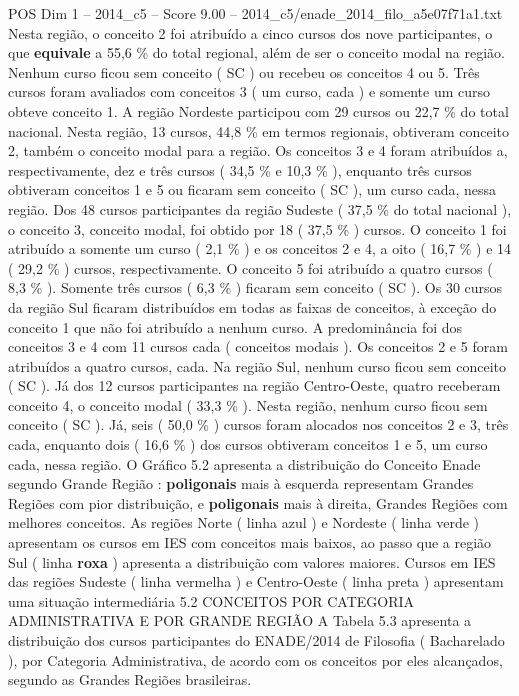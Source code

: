\begin{textsample}{POS Dim 1 – 2014\_c5 – Score 9.00 – 2014\_c5/enade\_2014\_filo\_a5e07f71a1.txt}
Nesta região, o conceito 2 foi atribuído a cinco cursos dos nove participantes, o que \textbf{equivale} a 55,6 \% do total regional, além de ser o conceito modal na região.
Nenhum curso ficou sem conceito ( SC ) ou recebeu os conceitos 4 ou 5.
Três cursos foram avaliados com conceitos 3 ( um curso, cada ) e somente um curso obteve conceito 1.
A região Nordeste participou com 29 cursos ou 22,7 \% do total nacional.
Nesta região, 13 cursos, 44,8 \% em termos regionais, obtiveram conceito 2, também o conceito modal para a região.
Os conceitos 3 e 4 foram atribuídos a, respectivamente, dez e três cursos ( 34,5 \% e 10,3 \% ), enquanto três cursos obtiveram conceitos 1 e 5 ou ficaram sem conceito ( SC ), um curso cada, nessa região.
Dos 48 cursos participantes da região Sudeste ( 37,5 \% do total nacional ), o conceito 3, conceito modal, foi obtido por 18 ( 37,5 \% ) cursos.
O conceito 1 foi atribuído a somente um curso ( 2,1 \% ) e os conceitos 2 e 4, a oito ( 16,7 \% ) e 14 ( 29,2 \% ) cursos, respectivamente.
O conceito 5 foi atribuído a quatro cursos ( 8,3 \% ).
Somente três cursos ( 6,3 \% ) ficaram sem conceito ( SC ).
Os 30 cursos da região Sul ficaram distribuídos em todas as faixas de conceitos, à exceção do conceito 1 que não foi atribuído a nenhum curso.
A predominância foi dos conceitos 3 e 4 com 11 cursos cada ( conceitos modais ).
Os conceitos 2 e 5 foram atribuídos a quatro cursos, cada.
Na região Sul, nenhum curso ficou sem conceito ( SC ).
Já dos 12 cursos participantes na região Centro-Oeste, quatro receberam conceito 4, o conceito modal ( 33,3 \% ).
Nesta região, nenhum curso ficou sem conceito ( SC ).
Já, seis ( 50,0 \% ) cursos foram alocados nos conceitos 2 e 3, três cada, enquanto dois ( 16,6 \% ) dos cursos obtiveram conceitos 1 e 5, um curso cada, nessa região.
O Gráfico 5.2 apresenta a distribuição do Conceito Enade segundo Grande Região : \textbf{poligonais} mais à esquerda representam Grandes Regiões com pior distribuição, e \textbf{poligonais} mais à direita, Grandes Regiões com melhores conceitos.
As regiões Norte ( linha azul ) e Nordeste ( linha verde ) apresentam os cursos em IES com conceitos mais baixos, ao passo que a região Sul ( linha \textbf{roxa} ) apresenta a distribuição com valores maiores.
Cursos em IES das regiões Sudeste ( linha vermelha ) e Centro-Oeste ( linha preta ) apresentam uma situação intermediária 5.2 CONCEITOS POR CATEGORIA ADMINISTRATIVA E POR GRANDE REGIÃO A Tabela 5.3 apresenta a distribuição dos cursos participantes do ENADE/2014 de Filosofia ( Bacharelado ), por Categoria Administrativa, de acordo com os conceitos por eles alcançados, segundo as Grandes Regiões brasileiras.

\end{textsample}
